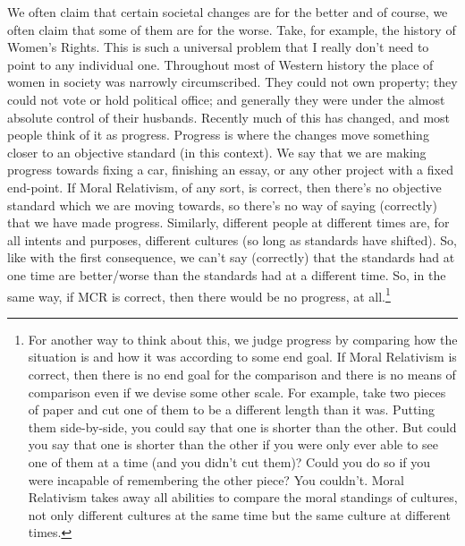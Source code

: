 We often claim that certain societal changes are for the better and of course, we often claim that some of them are for the worse. Take, for example, the history of Women's Rights. This is such a universal problem that I really don't need to point to any individual one. Throughout most of Western history the place of women in society was narrowly circumscribed. They could not own property; they could not vote or hold political office; and generally they were under the almost absolute control of their husbands. Recently much of this has changed, and most people think of it as progress. Progress is where the changes move something closer to an objective standard (in this context). We say that we are making progress towards fixing a car, finishing an essay, or any other project with a fixed end-point. If Moral Relativism, of any sort, is correct, then there's no objective standard which we are moving towards, so there's no way of saying (correctly) that we have made progress. Similarly, different people at different times are, for all intents and purposes, different cultures (so long as standards have shifted). So, like with the first consequence, we can't say (correctly) that the standards had at one time are better/worse than the standards had at a different time. So, in the same way, if MCR is correct, then there would be no progress, at all.\footnote{For another way to think about this, we judge progress by comparing how the situation is and how it was according to some end goal. If Moral Relativism is correct, then there is no end goal for the comparison and there is no means of comparison even if we devise some other scale. For example, take two pieces of paper and cut one of them to be a different length than it was. Putting them side-by-side, you could say that one is shorter than the other. But could you say that one is shorter than the other if you were only ever able to see one of them at a time (and you didn't cut them)? Could you do so if you were incapable of remembering the other piece? You couldn't. Moral Relativism takes away all abilities to compare the moral standings of cultures, not only different cultures at the same time but the same culture at different times.}

